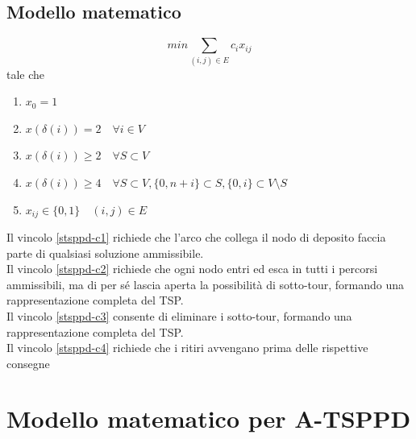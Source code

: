 \documentclass[9pt]{beamer}
\begin{document}
\subsection{Modello matematico}
\begin{frame}{\subsecname}

     	\[ min{ \sum_{(i,j) \in E} c_i x_{ij}} \]
	tale che
	\begin{enumerate}
		\item
		\label{stsppd-c1}
		$x_0 = 1$

		\item
		\label{stsppd-c2}
		$x(\delta(i)) = 2 \quad \forall i \in V$

		\item
		\label{stsppd-c3}
		$x(\delta(i)) \geq 2 \quad \forall S \subset V$
	
		\item
		\label{stsppd-c4}
		$x(\delta(i)) \geq 4 \quad \forall S \subset V, \{0, n+i\} \subset S, \{0,i\} \subset V \setminus S$	%

		\item
		$x_{ij} \in \{0,1\} \quad (i,j) \in E$
	\end{enumerate}
	
	\footnotesize
	Il vincolo \ref{stsppd-c1} richiede che l'arco che collega il nodo di deposito faccia parte di qualsiasi soluzione ammissibile. \\
	Il vincolo \ref{stsppd-c2} richiede che ogni nodo entri ed esca in tutti i percorsi ammissibili, ma di per sé lascia aperta la possibilità di sotto-tour, formando una rappresentazione completa del TSP. \\
	Il vincolo \ref{stsppd-c3} consente di eliminare i sotto-tour, formando una rappresentazione completa del TSP. \\
	Il vincolo \ref{stsppd-c4} richiede che i ritiri avvengano prima delle rispettive consegne

\end{frame}

\section{Modello matematico per A-TSPPD}
\end{document}
